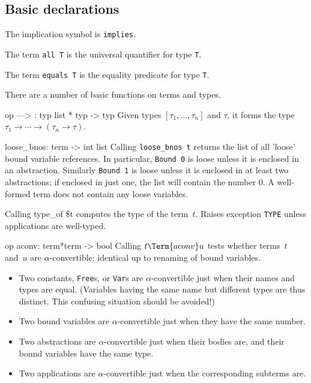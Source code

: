 


\subsection{Basic declarations}
The implication symbol is {\tt implies}.

The term \verb|all T| is the universal quantifier for type {\tt T}\@.

The term \verb|equals T| is the equality predicate for type {\tt T}\@.


There are a number of basic functions on terms and types.

\index{--->}
\beginprog
op ---> : typ list * typ -> typ
\endprog
Given types \([ \tau_1, \ldots, \tau_n]\) and \(\tau\), it
forms the type \(\tau_1\to \cdots \to (\tau_n\to\tau)\).

\beginprog
loose_bnos: term -> int list
\endprog
Calling \verb|loose_bnos t| returns the list of all 'loose' bound variable
references.  In particular, {\tt Bound~0} is loose unless it is enclosed in
an abstraction.  Similarly {\tt Bound~1} is loose unless it is enclosed in
at least two abstractions; if enclosed in just one, the list will contain
the number 0.  A well-formed term does not contain any loose variables.

Calling {\prog{}type_of \${t}} computes the type of the
term~$t$.  Raises exception {\tt TYPE} unless applications are well-typed.

\beginprog
op aconv: term*term -> bool
\endprog
Calling $t\Term{ aconv }u$ tests whether terms~$t$ and~$u$ are
\(\alpha\)-convertible: identical up to renaming of bound variables.
\begin{itemize}
  \item
    Two constants, {\tt Free}s, or {\tt Var}s are \(\alpha\)-convertible
    just when their names and types are equal.
    (Variables having the same name but different types are thus distinct.
    This confusing situation should be avoided!)
  \item
    Two bound variables are \(\alpha\)-convertible
    just when they have the same number.
  \item
    Two abstractions are \(\alpha\)-convertible
    just when their bodies are, and their bound variables have the same type.
  \item
    Two applications are \(\alpha\)-convertible
    just when the corresponding subterms are.
\end{itemize}


